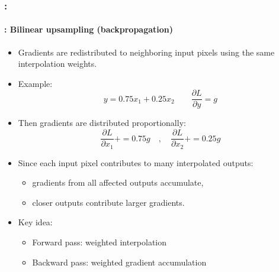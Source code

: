 \documentclass[xcolor=table]{beamer}
\begin{document}
\begin{frame}
	\frametitle{\insertshortsubtitle: \insertsection}
	\framesubtitle{\insertsubsection: Bilinear upsampling (backpropagation)}
	
	\begin{itemize}
		
		\item Gradients are redistributed to neighboring input pixels using the same interpolation weights.
		
		\item Example:
		\[
		y = 0.75x_1 + 0.25x_2 \quad\quad \frac{\partial L}{\partial y} = g
		\]
		
		\item Then gradients are distributed proportionally:
		\[
		\frac{\partial L}{\partial x_1} += 0.75g
		\quad,\quad
		\frac{\partial L}{\partial x_2} += 0.25g
		\]
		
		\item Since each input pixel contributes to many interpolated outputs:
		\begin{itemize}
			\item gradients from all affected outputs accumulate,
			\item closer outputs contribute larger gradients.
		\end{itemize}
		
		\item Key idea:
		\begin{itemize}
			\item Forward pass: weighted interpolation
			\item Backward pass: weighted gradient accumulation
		\end{itemize}
		
	\end{itemize}
	
\end{frame}
\end{document}
